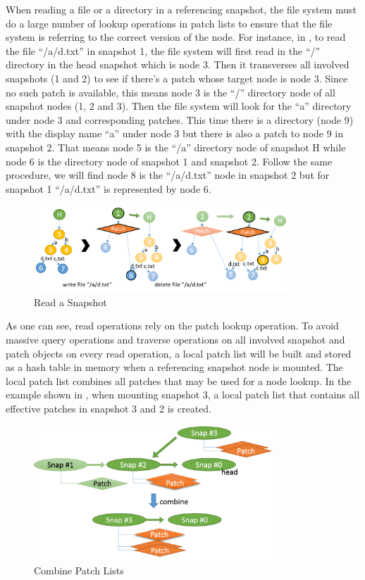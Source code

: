     When reading a file or a directory in a referencing snapshot, the file system must do a large number of lookup operations in patch lists to ensure that the file system is referring to the correct version of the node. For instance, in , to read the file ``/a/d.txt'' in snapshot 1, the file system will first read in the ``/'' directory in the head snapshot which is node 3. Then it transverses all involved snapshots (1 and 2) to see if there's a patch whose target node is node 3. Since no such patch is available, this means node 3 is the ``/'' directory node of all snapshot nodes (1, 2 and 3). Then the file system will look for the ``a'' directory under node 3 and corresponding patches. This time there is a directory (node 9) with the display name ``a'' under node 3 but there is also a patch to node 9 in snapshot 2. That means node 5 is the ``/a'' directory node of snapshot H while node 6 is the directory node of snapshot 1 and snapshot 2. Follow the same procedure, we will find node 8 is the ``/a/d.txt'' node in snapshot 2 but for snapshot 1 ``/a/d.txt'' is represented by node 6.

\begin{figure}[t]
\centering
\includegraphics[width=0.85\textwidth]{Chapter-4/figs/fig18.png}
\caption{Read a Snapshot}
\label{fig:read_patches}
\end{figure}

    As one can see, read operations rely on the patch lookup operation. To avoid massive query operations and traverse operations on all involved snapshot and patch objects on every read operation, a local patch list will be built and stored as a hash table in memory when a referencing snapshot node is mounted. The local patch list combines all patches that may be used for a node lookup. In the example shown in , when mounting snapshot 3, a local patch list that contains all effective patches in snapshot 3 and 2 is created.

\begin{figure}[t]
\centering
\includegraphics[width=0.8\textwidth]{Chapter-4/figs/fig15.png}
\caption{Combine Patch Lists}
\label{fig:combine_patch_list}
\end{figure}


